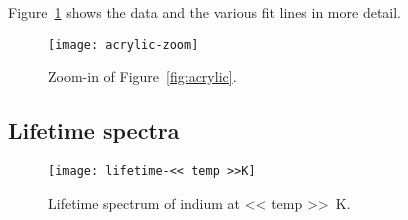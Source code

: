 \documentclass[11pt, english, fleqn, DIV=15, headinclude, BCOR=2cm]{scrreprt}
\begin{document}
Figure~\ref{fig:acrylic-zoom} shows the data and the various fit lines in more
detail.

\begin{figure}
    \centering
    \texttt{[image: acrylic-zoom]}
    \caption{%
        Zoom-in of Figure~\ref{fig:acrylic}.
    }
    \label{fig:acrylic-zoom}
\end{figure}


\begin{appendix}

    \chapter{Lifetime spectra}

    \begin{figure}[htbp]
        \centering
        \texttt{[image: lifetime-<< temp >>K]}
        \caption{%
            Lifetime spectrum of indium at \SI{<< temp >>}{\kelvin}.
        }
        \label{fig:lifetime-<< temp >>K}
    \end{figure}
\end{appendix}
\end{document}
